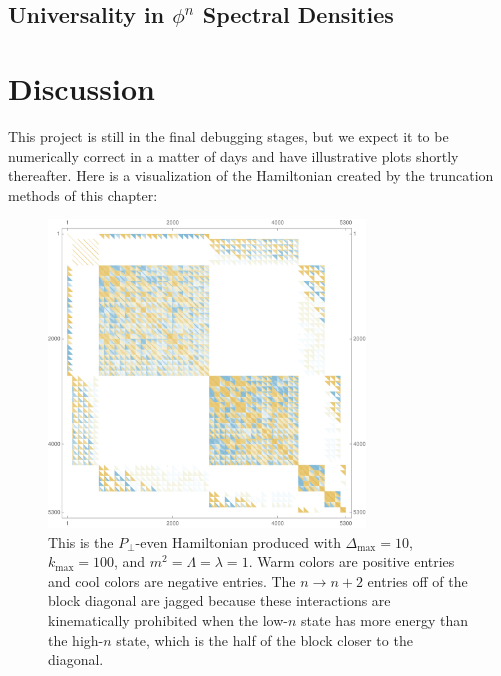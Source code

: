 

\subsection{Universality in $\phi^n$ Spectral Densities}








\section{Discussion}
\label{sec:Discussion}

This project is still in the final debugging stages, but we expect it to be
numerically correct in a matter of days and have illustrative plots shortly
thereafter. Here is a visualization of the Hamiltonian created by the truncation
methods of this chapter:

\begin{figure}
\centering
\includegraphics[width=0.75\textwidth]{truncation_chapter/hamiltonian}	
\caption[Visualization of truncated Hamiltonian]{This is the $P_\perp$-even 
    Hamiltonian produced with $\Delta_\mathrm{max} = 10$, 
    $k_\mathrm{max} = 100$, and $m^2 = \Lambda = \lambda = 1$. Warm colors are
    positive entries and cool colors are negative entries. The $n \to n+2$ 
    entries off of the block diagonal are jagged because these interactions are
    kinematically prohibited when the low-$n$ state has more energy than the
    high-$n$ state, which is the half of the block closer to the diagonal.}
\label{fig:TimelikeSeparation}
\end{figure}





